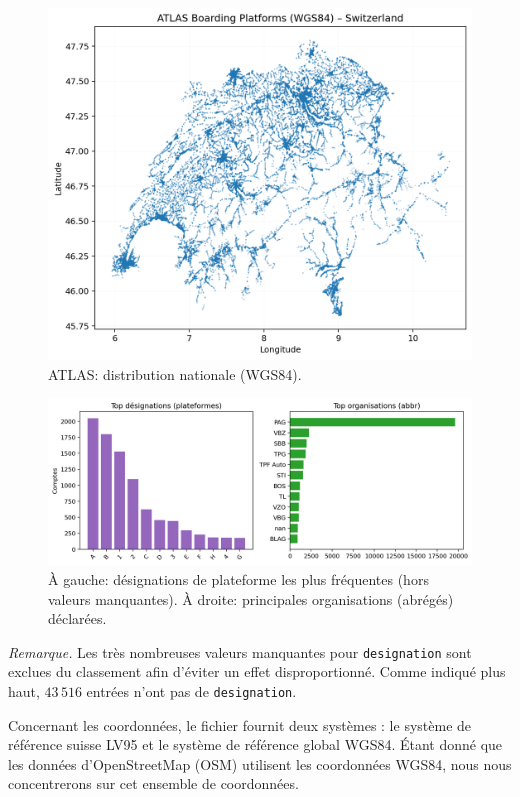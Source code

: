 \begin{figure}[H]
  \centering
  \includegraphics[width=.76\linewidth]{figures/plots/atlas_points_switzerland.png}
  \caption[ATLAS: distribution nationale]{ATLAS: distribution nationale (WGS84).}
  \label{fig:atlas_ch_points}
\end{figure}

\begin{figure}[H]
  \centering
  \includegraphics[width=.85\linewidth]{figures/plots/atlas_designation_operators.png}
  \caption[Désignations et opérateurs ATLAS]{À gauche: désignations de plateforme les plus fréquentes (hors valeurs manquantes). À droite: principales organisations (abrégés) déclarées.}
  \label{fig:atlas_distribs}
\end{figure}

\noindent\textit{Remarque.} Les très nombreuses valeurs manquantes pour \texttt{designation} sont exclues du classement afin d'éviter un effet disproportionné. Comme indiqué plus haut, \(43\,516\) entrées n'ont pas de \texttt{designation}.

Concernant les coordonnées, le fichier fournit deux systèmes : le système de référence suisse LV95 et le système de référence global WGS84. Étant donné que les données d'OpenStreetMap (OSM) utilisent les coordonnées WGS84, nous nous concentrerons sur cet ensemble de coordonnées.

